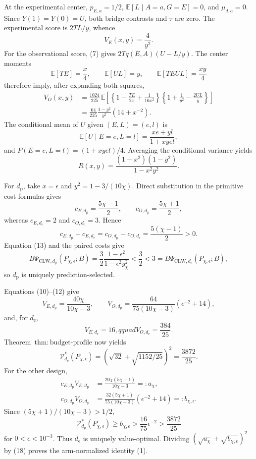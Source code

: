 At the experimental center, \(p_{E,a}=1/2\), \(\mathbb E[L\mid A=a,G=E]=0\), and \(\mu_{d,a}=0\). Since \(Y(1)=Y(0)=U\), both bridge contrasts and \(\tau\) are zero. The experimental score is \(2TL/y\), whence
\[
 V_E(x,y)=\frac4{y^2}.                                  \tag{10}
\]
For the observational score, (7) gives \(2Tq(E,A)(U-L/y)\). The center moments
\[
 \mathbb E[TE]=\frac{x}{4},\qquad
 \mathbb E[UL]=y,
 \qquad
 \mathbb E[TEUL]=\frac{xy}{4}                           \tag{11}
\]
therefore imply, after expanding both squares,
\[
\begin{aligned}
 V_O(x,y)
 &=\frac{1024}{225}\,
 \mathbb E\!\left[
 \left\{1-\frac{TE}{2x}+\frac1{16x^2}\right\}
 \left\{1+\frac1{y^2}-\frac{2UL}{y}\right\}
 \right]\\
 &=\frac{64}{225}\frac{1-y^2}{y^2}\left(14+x^{-2}\right).
                                                               \tag{12}
\end{aligned}
\]
The conditional mean of \(U\) given \((E,L)=(e,l)\) is
\[
 \mathbb E[U\mid E=e,L=l]=\frac{xe+yl}{1+xyel},
\]
and \(P(E=e,L=l)=(1+xyel)/4\). Averaging the conditional variance yields
\[
 R(x,y)=\frac{(1-x^2)(1-y^2)}{1-x^2y^2}.               \tag{13}
\]

For \(d_{\mathrm p}\), take \(x=\epsilon\) and \(y^2=1-3/(10\chi)\). Direct substitution in the primitive cost formulas gives
\[
 c_{E,d_{\mathrm p}}=\frac{5\chi-1}{2},\qquad
 c_{O,d_{\mathrm p}}=\frac{5\chi+1}{2},
\]
whereas \(c_{E,d_{\mathrm e}}=2\) and \(c_{O,d_{\mathrm e}}=3\). Hence
\[
 c_{E,d_{\mathrm p}}-c_{E,d_{\mathrm e}}
 =c_{O,d_{\mathrm p}}-c_{O,d_{\mathrm e}}
 =\frac{5(\chi-1)}2>0.                                 \tag{14}
\]
Equation (13) and the paired costs give
\[
 B\Psi_{\mathrm{CLW},d_{\mathrm p}}(P_{\chi,\epsilon};B)
 =\frac32\frac{1-\epsilon^2}{1-\epsilon^2y_\chi^2}
 <\frac32<3
 =B\Psi_{\mathrm{CLW},d_{\mathrm e}}(P_{\chi,\epsilon};B), \tag{15}
\]
so \(d_{\mathrm p}\) is uniquely prediction-selected.

Equations (10)--(12) give
\[
 V_{E,d_{\mathrm p}}=\frac{40\chi}{10\chi-3},
 \qquad
 V_{O,d_{\mathrm p}}
 =\frac{64}{75(10\chi-3)}(\epsilon^{-2}+14),           \tag{16}
\]
and, for \(d_{\mathrm e}\),
\[
 V_{E,d_{\mathrm e}}=16,qquad
 V_{O,d_{\mathrm e}}=\frac{384}{25}.                   \tag{17}
\]
Theorem~\(\mathrm{thm{:}budget\text{-}profile}\) now yields
\[
 \mathcal V_{d_{\mathrm e}}^*(P_{\chi,\epsilon})
 =\left(\sqrt{32}+\sqrt{1152/25}\right)^2
 =\frac{3872}{25}.                                     \tag{18}
\]
For the other design,
\[
\begin{aligned}
 c_{E,d_{\mathrm p}}V_{E,d_{\mathrm p}}
 &=\frac{20\chi(5\chi-1)}{10\chi-3}=:a_{\chi},\\
 c_{O,d_{\mathrm p}}V_{O,d_{\mathrm p}}
 &=\frac{32(5\chi+1)}{75(10\chi-3)}
   (\epsilon^{-2}+14)=:b_{\chi,\epsilon}.             \tag{19}
\end{aligned}
\]
Since \((5\chi+1)/(10\chi-3)>1/2\),
\[
 \mathcal V_{d_{\mathrm p}}^*(P_{\chi,\epsilon})
 \ge b_{\chi,\epsilon}
 >\frac{16}{75}\epsilon^{-2}
 >\frac{3872}{25}                                      \tag{20}
\]
for \(0<\epsilon<10^{-3}\). Thus \(d_{\mathrm e}\) is uniquely value-optimal. Dividing \((\sqrt{a_{\chi}}+\sqrt{b_{\chi,\epsilon}})^2\) by (18) proves the arm-normalized identity (1).

